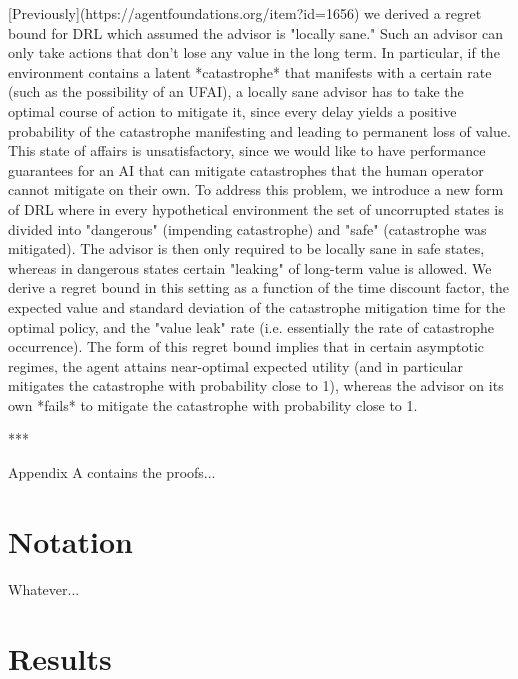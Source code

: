 \documentclass[a4paper]{article}
\begin{document}
[Previously](https://agentfoundations.org/item?id=1656) we derived a regret bound for DRL which assumed the advisor is "locally sane." Such an advisor can only take actions that don't lose any value in the long term. In particular, if the environment contains a latent *catastrophe* that manifests with a certain rate (such as the possibility of an UFAI), a locally sane advisor has to take the optimal course of action to mitigate it, since every delay yields a positive probability of the catastrophe manifesting and leading to permanent loss of value. This state of affairs is unsatisfactory, since we would like to have performance guarantees for an AI that can mitigate catastrophes that the human operator cannot mitigate on their own. To address this problem, we introduce a new form of DRL where in every hypothetical environment the set of uncorrupted states is divided into "dangerous" (impending catastrophe) and "safe" (catastrophe was mitigated). The advisor is then only required to be locally sane in safe states, whereas in dangerous states certain "leaking" of long-term value is allowed. We derive a regret bound in this setting as a function of the time discount factor, the expected value and standard deviation of the catastrophe mitigation time for the optimal policy, and the "value leak" rate (i.e. essentially the rate of catastrophe occurrence). The form of this regret bound implies that in certain asymptotic regimes, the agent attains near-optimal expected utility (and in particular mitigates the catastrophe with probability close to 1), whereas the advisor on its own *fails* to mitigate the catastrophe with probability close to 1. %

***

Appendix A contains the proofs...

\section{Notation}

Whatever...

\section{Results}
\end{document}
